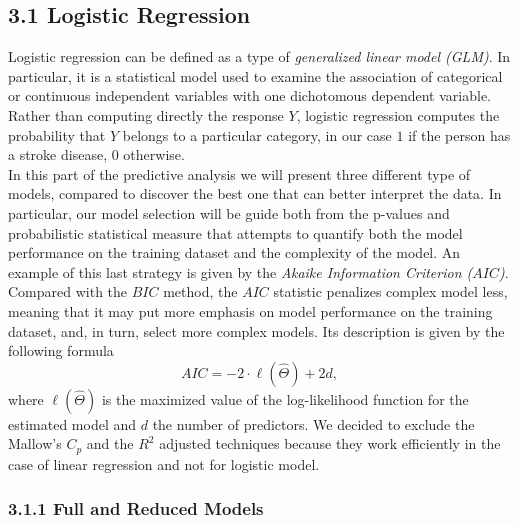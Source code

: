 \documentclass[
]{article}
\begin{document}
\hypertarget{logistic-regression}{%
\subsection{3.1 Logistic Regression}\label{logistic-regression}}

Logistic regression can be defined as a type of \emph{generalized linear
model (GLM)}. In particular, it is a statistical model used to examine
the association of categorical or continuous independent variables with
one dichotomous dependent variable.\\
Rather than computing directly the response \(Y\), logistic regression
computes the probability that \(Y\) belongs to a particular category, in
our case \(1\) if the person has a stroke disease, \(0\) otherwise.\\
In this part of the predictive analysis we will present three different
type of models, compared to discover the best one that can better
interpret the data. In particular, our model selection will be guide
both from the p-values and probabilistic statistical measure that
attempts to quantify both the model performance on the training dataset
and the complexity of the model. An example of this last strategy is
given by the \emph{Akaike Information Criterion (\(AIC\))}.\\
Compared with the \(BIC\) method, the \(AIC\) statistic penalizes
complex model less, meaning that it may put more emphasis on model
performance on the training dataset, and, in turn, select more complex
models. Its description is given by the following formula
\[ AIC = -2 \cdot \ell(\hat \Theta ) + 2d,\] where
\(\ell(\hat \Theta )\) is the maximized value of the log-likelihood
function for the estimated model and \(d\) the number of predictors. We
decided to exclude the Mallow's \(C_p\) and the \(R^2\) adjusted
techniques because they work efficiently in the case of linear
regression and not for logistic model.

\hypertarget{full-and-reduced-models}{%
\subsubsection{3.1.1 Full and Reduced
Models}\label{full-and-reduced-models}}
\end{document}
